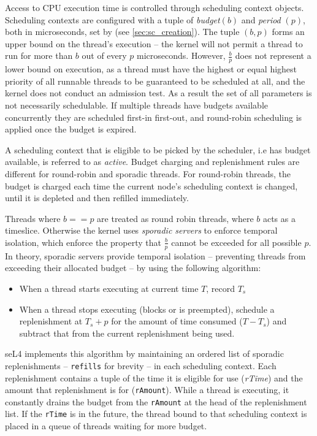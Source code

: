 Access to CPU execution time is controlled through scheduling context objects.
Scheduling contexts are configured with a tuple of
\textit{budget}$(b)$ and \textit{period} $(p)$, both in microseconds, set by
 (see \autoref{sec:sc_creation}).
The tuple $(b, p)$ forms an upper bound on the thread's execution -- the kernel will not permit a
thread to run for more than $b$ out of every $p$ microseconds. However, $\frac{b}{p}$ does not
represent a lower bound on execution, as a thread must have the highest or equal highest priority
of all runnable threads to be guaranteed to be scheduled at all, and the kernel does not conduct
an admission test. As a result the set of all parameters is not necessarily schedulable. If
multiple threads have budgets available concurrently they are scheduled first-in first-out, and
round-robin scheduling is applied once the budget is expired.

A scheduling context that is eligible to be picked by the scheduler, i.e has budget available, is
referred to as \emph{active}.  Budget charging and replenishment rules are different for round-robin
and sporadic threads.  For round-robin threads, the budget is charged each time the current node's
scheduling context is changed, until it is depleted and then refilled immediately.

Threads where $b == p$ are treated as round robin threads, where $b$ acts as a timeslice.
Otherwise the kernel uses \emph{sporadic servers} to enforce temporal isolation, which enforce the
property that $\frac{b}{p}$ cannot be exceeded for all possible $p$.
In theory, sporadic servers provide temporal isolation -- preventing threads from exceeding their allocated budget -- by using the following algorithm:

\begin{itemize}
\item When a thread starts executing at current time $T$, record $T_{s}$
\item When a thread stops executing (blocks or is preempted), schedule a replenishment at $T_{s} + p$ for the
amount of time consumed ($T - T_{s}$) and subtract that from the current replenishment being used.
\end{itemize}

seL4 implements this algorithm by maintaining an ordered list of sporadic replenishments --
\texttt{refills} for brevity -- in each scheduling context. Each replenishment contains a tuple
of the time it is eligible for use (\emph{rTime}) and the amount that replenishment is for
(\texttt{rAmount}).
While a thread is executing, it constantly drains the budget from the \texttt{rAmount} at the head of the
replenishment list. If the \texttt{rTime} is in the future, the thread bound to that
scheduling context is placed in a queue of threads waiting for more budget.


